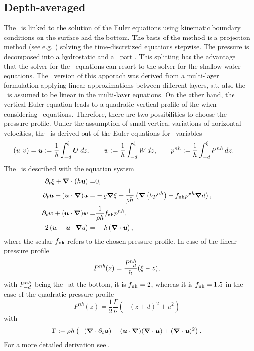 \subsection{Depth-averaged \nheswe}
The \nheswe\ is linked to the solution of the Euler equations using kinematic boundary conditions on the surface and the bottom. The basis of the method is a projection method (see e.g. \cite{Chorin.1968}) solving the time-discretized equations stepwise. 
The pressure is decomposed into a hydrostatic and a \nh\ part \cite{CasulliStelling.1998, StansbyZhou.1998}. This splitting has the advantage that the solver for the \nh\ equations can resort to the solver for the shallow water equations. 
The \da\ version of this apporach was derived from a multi-layer formulation  \cite{StellingZijlema.2003} applying linear approximations between different layers, s.t. also the \nhp\ is assumed to be linear in the multi-layer equations. On the other hand, the vertical Euler equation leads to a quadratic vertical profile of the \nhp when considering \da\ equations. Therefore, there are two possibilities to choose the pressure profile.
Under the assumption of small vertical variations of horizontal velocities, the \danheswe\ is derived out of the Euler equations for \da\ variables
\begin{align}
  (u,v)=\boldsymbol{u}:=\frac{1}{h}\int_{-d}^{\xi}{\boldsymbol{U}}\,dz, \qquad w:=\frac{1}{h}\int_{-d}^{\xi}{W}\,dz, \qquad p^{nh}&:=\frac{1}{h}\int_{-d}^{\xi}{P^{nh}}\,dz. \label{eq:def_pnh}
\end{align}
The \danheswe\ is described with the equation system
\begin{align}
\partial_t \xi+\boldsymbol{\nabla} \cdot (h\boldsymbol{u})=&0, \label{eq:nh_conti} \\
\partial_t \boldsymbol{u}+(\boldsymbol{u} \cdot \boldsymbol{\nabla})\boldsymbol{u}=&-g\boldsymbol{\nabla} \xi-\frac{1}{\rho h}\left(\boldsymbol{\nabla} \left(hp^{nh} \right) -f_{\text{nh}}p^{nh} \boldsymbol{\nabla} d\right), \label{eq:nh_Momxy} \\
\partial_t w+(\boldsymbol{u} \cdot \boldsymbol{\nabla})w=&\frac{1}{\rho h}f_{\text{nh}}p^{nh}, \label{eq:nh_Momz} \\
2 \left(w+\boldsymbol{u} \cdot \boldsymbol{\nabla} d \right)=&-h\left(\boldsymbol{\nabla} \cdot \boldsymbol{u}\right), \label{eq:nh_closure}
\end{align} 
where the scalar $f_{\text{nh}}$ refers to the chosen pressure profile. In case of the linear pressure profile
\begin{equation}
  P^{nh}(z)=\frac{P^{nh}_{-d}}{h}(\xi -z),
\end{equation}
with $P^{nh}_{-d}$ being the \nhp\ at the bottom, it is $f_{\text{nh}}=2$, whereas it is $f_{\text{nh}}=1.5$ in the case of the quadratic pressure profile
\begin{equation}
 P^{nh}(z)=\frac{1}{2}\frac{\Gamma}{h}\left(-(z+d)^2+h^2\right)%
\end{equation}
with
\begin{align*}
  \Gamma &:= \rho h\left( -(\boldsymbol{\nabla} \cdot \partial_t \boldsymbol{u}) - (\boldsymbol{u} \cdot \boldsymbol{\nabla}) (\boldsymbol{\nabla} \cdot \boldsymbol{u}) + (\boldsymbol{\nabla} \cdot \boldsymbol{u})^2 \right). \\
\end{align*}
For a more detailed derivation see \cite{Jeschke.2016}.



